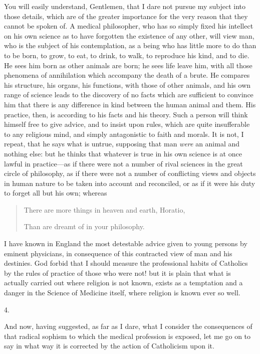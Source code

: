 You will easily understand, Gentlemen, that I dare not pursue my
subject into those details, which are of the greater importance for
the very reason that they cannot be spoken of. A medical philosopher,
who has so simply fixed his intellect on his own science as to have
forgotten the existence of any other, will view man, who is the
subject of his contemplation, as a being who has little more to do
than to be born, to grow, to eat, to drink, to walk, to reproduce his
kind, and to die. He sees him born as other animals are born; he sees
life leave him, with all those phenomena of annihilation which
accompany the death of a brute. He compares his structure, his organs,
his functions, with those of other animals, and his own range of
science leads to the discovery of no facts which are sufficient to
convince him that there is any difference in kind between the human
animal and them. His practice, then, is according to his facts and his
theory. Such a person will think himself free to give advice,
and to insist upon rules, which are quite insufferable to any
religious mind, and simply antagonistic to faith and morals. It is
not, I repeat, that he says what is untrue, supposing that man \emph{were}
an animal and nothing else: but he thinks that whatever is true in his
own science is at once lawful in practice—as if there were not a
number of rival sciences in the great circle of philosophy, as if
there were not a number of conflicting views and objects in human
nature to be taken into account and reconciled, or as if it were his
duty to forget all but his own; whereas

\begin{quote}

There are more things in heaven and earth, Horatio,

Than are dreamt of in your philosophy.

\end{quote}

I have known in England the most detestable advice given to young
persons by eminent physicians, in consequence of this contracted view
of man and his destinies. God forbid that I should measure the
professional habits of Catholics by the rules of practice of those who
were not! but it is plain that what is actually carried out where
religion is not known, exists as a temptation and a danger in the
Science of Medicine itself, where religion is known ever so well.

4.

And now, having suggested, as far as I dare, what I consider the
consequences of that radical sophism to which the medical profession
is exposed, let me go on to say in what way it is corrected by the
action of Catholicism upon it.

